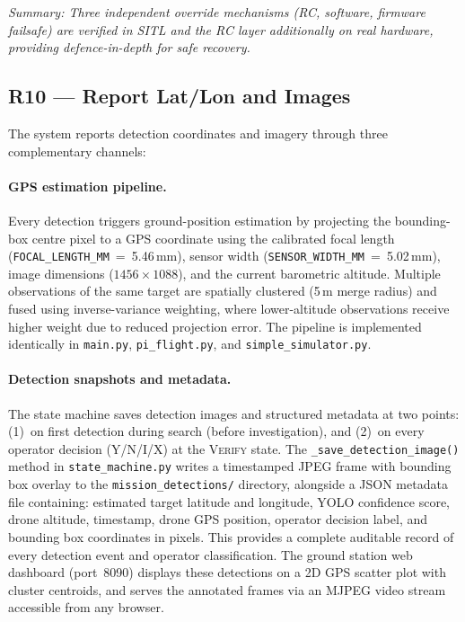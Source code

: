 \noindent\textit{Summary: Three independent override mechanisms (RC, software, firmware failsafe) are verified in SITL and the RC layer additionally on real hardware, providing defence-in-depth for safe recovery.}

\subsection{R10 --- Report Lat/Lon and Images}

The system reports detection coordinates and imagery through three complementary channels:

\paragraph{GPS estimation pipeline.} Every detection triggers ground-position estimation by projecting the bounding-box centre pixel to a GPS coordinate using the calibrated focal length (\texttt{FOCAL\_LENGTH\_MM}~=~5.46\,mm), sensor width (\texttt{SENSOR\_WIDTH\_MM}~=~5.02\,mm), image dimensions ($1456\times1088$), and the current barometric altitude. Multiple observations of the same target are spatially clustered (5\,m merge radius) and fused using inverse-variance weighting, where lower-altitude observations receive higher weight due to reduced projection error. The pipeline is implemented identically in \texttt{main.py}, \texttt{pi\_flight.py}, and \texttt{simple\_simulator.py}.

\paragraph{Detection snapshots and metadata.} The state machine saves detection images and structured metadata at two points: (1)~on first detection during search (before investigation), and (2)~on every operator decision (Y/N/I/X) at the \textsc{Verify} state. The \texttt{\_save\_detection\_image()} method in \texttt{state\_machine.py} writes a timestamped JPEG frame with bounding box overlay to the \texttt{mission\_detections/} directory, alongside a JSON metadata file containing: estimated target latitude and longitude, YOLO confidence score, drone altitude, timestamp, drone GPS position, operator decision label, and bounding box coordinates in pixels. This provides a complete auditable record of every detection event and operator classification. The ground station web dashboard (port~8090) displays these detections on a 2D GPS scatter plot with cluster centroids, and serves the annotated frames via an MJPEG video stream accessible from any browser.

